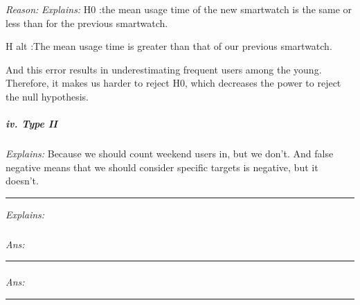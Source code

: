 \documentclass[
]{article}
\newenvironment{Shaded}{\begin{snugshade}}{\end{snugshade}}
\newcommand{\FunctionTok}[1]{\textcolor[rgb]{0.00,0.00,0.00}{#1}}
\newcommand{\NormalTok}[1]{#1}
\newcommand{\OtherTok}[1]{\textcolor[rgb]{0.56,0.35,0.01}{#1}}
\newcommand{\SpecialCharTok}[1]{\textcolor[rgb]{0.00,0.00,0.00}{#1}}
\newcommand{\StringTok}[1]{\textcolor[rgb]{0.31,0.60,0.02}{#1}}
\begin{document}
\emph{Reason:} \emph{Explains:} H0 :the mean usage time of the new
smartwatch is the same or less than for the previous smartwatch.

H alt :The mean usage time is greater than that of our previous
smartwatch.

And this error results in underestimating frequent users among the
young. Therefore, it makes us harder to reject H0, which decreases the
power to reject the null hypothesis.

\hypertarget{iv.-type-ii}{%
\subparagraph{\texorpdfstring{iv. \emph{Type
II}}{iv. Type II}}\label{iv.-type-ii}}

\emph{Explains:} Because we should count weekend users in, but we don't.
And false negative means that we should consider specific targets is
negative, but it doesn't.

\begin{center}\rule{0.5\linewidth}{0.5pt}\end{center}

\emph{Explains:}

\hypertarget{section}{%
\subparagraph{}\label{section}}

\begin{Shaded}
\end{Shaded}

\emph{Ans:}

\begin{center}\rule{0.5\linewidth}{0.5pt}\end{center}

\hypertarget{section-1}{%
\paragraph{}\label{section-1}}

\emph{Ans:}

\begin{center}\rule{0.5\linewidth}{0.5pt}\end{center}

\hypertarget{section-2}{%
\paragraph{}\label{section-2}}
\end{document}
